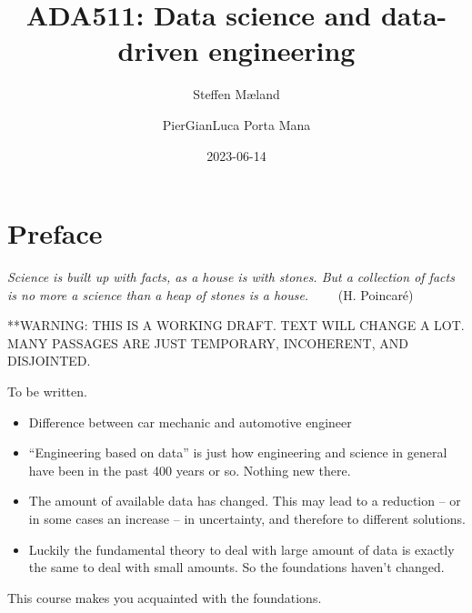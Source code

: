 \documentclass[
  a4paper,
  DIV=11,
  numbers=noendperiod,
  oneside]{scrreprt}
\title{ADA511: Data science and data-driven engineering}
\author{Steffen Mæland \and PierGianLuca Porta Mana}
\date{2023-06-14}
\renewcommand*\contentsname{Table of contents}
\newcommand\contentsname{Table of contents}
\begin{document}
\maketitle
\ifdefined\Shaded\renewenvironment{Shaded}{\begin{tcolorbox}[enhanced, breakable, borderline west={3pt}{0pt}{shadecolor}, frame hidden, boxrule=0pt, sharp corners, interior hidden]}{\end{tcolorbox}}\fi

\renewcommand*\contentsname{Table of contents}
{
\hypersetup{linkcolor=}
\setcounter{tocdepth}{2}
\tableofcontents
}

\hypertarget{preface}{%
\chapter*{Preface}\label{preface}}


\hfill\break
\hfill\break
\hfill\break
\hfill\break
\hfill\break
\hfill\break

\emph{Science is built up with facts, as a house is with stones. But a
collection of facts is no more a science than a heap of stones is a
house.} ~~~~{(H. Poincaré)}

**WARNING: THIS IS A WORKING DRAFT. TEXT WILL CHANGE A LOT. MANY
PASSAGES ARE JUST TEMPORARY, INCOHERENT, AND DISJOINTED.

To be written.

\begin{itemize}
\item
  Difference between car mechanic and automotive engineer
\item
  ``Engineering based on data'' is just how engineering and science in
  general have been in the past 400 years or so. Nothing new there.
\item
  The amount of available data has changed. This may lead to a reduction
  -- or in some cases an increase -- in uncertainty, and therefore to
  different solutions.
\item
  Luckily the fundamental theory to deal with large amount of data is
  exactly the same to deal with small amounts. So the foundations
  haven't changed.
\end{itemize}

This course makes you acquainted with the foundations.

\end{document}
